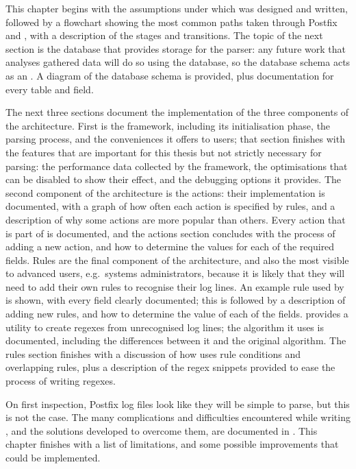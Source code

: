 This chapter begins with the assumptions under which \parsername{} was
designed and written, followed by a flowchart showing the most common paths
taken through Postfix and \parsername{}, with a description of the stages
and transitions.  The topic of the next section is the database that
provides storage for the parser: any future work that analyses gathered
data will do so using the database, so the database schema acts as an
.  A diagram of the database schema is provided, plus
documentation for every table and field.

The next three sections document the implementation of the three components
of the architecture.  First is the framework, including its initialisation
phase, the parsing process, and the conveniences it offers to users; that
section finishes with the features that are important for this thesis but
not strictly necessary for parsing: the performance data collected by the
framework, the optimisations that can be disabled to show their effect, and
the debugging options it provides.  The second component of the
architecture is the actions: their implementation is documented, with a
graph of how often each action is specified by rules, and a description of
why some actions are more popular than others.  Every action that is part
of \parsername{} is documented, and the actions section concludes with the
process of adding a new action, and how to determine the values for each of
the required fields.  Rules are the final component of the architecture,
and also the most visible to advanced users, e.g.\ systems administrators,
because it is likely that they will need to add their own rules to
recognise their log lines.  An example rule used by \parsername{} is shown,
with every field clearly documented; this is followed by a description of
adding new rules, and how to determine the value of each of the fields.
\parsername{} provides a utility to create regexes from unrecognised log
lines; the algorithm it uses is documented, including the differences
between it and the original algorithm.  The rules section finishes with a
discussion of how \parsername{} uses rule conditions and overlapping rules,
plus a description of the regex snippets provided to ease the process of
writing regexes.

On first inspection, Postfix log files look like they will be simple to
parse, but this is not the case.  The many complications and difficulties
encountered while writing \parsername{}, and the solutions developed to
overcome them, are documented in .  This chapter
finishes with a list of \parsernames{} limitations, and some possible
improvements that could be implemented.

